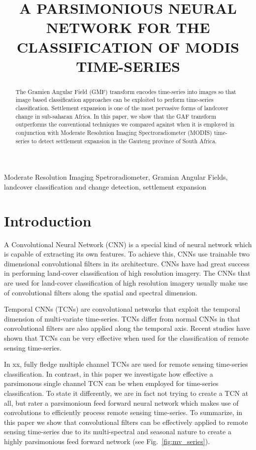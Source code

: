 \documentclass{article}
\title{A PARSIMONIOUS NEURAL NETWORK FOR THE CLASSIFICATION OF MODIS TIME-SERIES}
\begin{document}
%
\maketitle
%
\begin{abstract}
The Gramien Angular Field (GMF) transform encodes time-series into images so that image based classification approaches can be exploited to perform time-series classification. Settlement expansion is one of the most pervasive forms of landcover change in sub-saharan Africa. In this paper, we show that the GAF transform outperforms the conventional techniques we compared against when it is employed in conjunction with Moderate Resolution Imaging Spectroradiometer (MODIS) time-series to detect settlement expansion in the Gauteng province of South Africa.   
\end{abstract}
%
\begin{keywords}
Moderate Resolution Imaging Spetroradiometer, Gramian Angular Fields, landcover classification and change detection, settlement expansion
\end{keywords}
%
\section{Introduction}
\label{sec:intro}
A Convolutional Neural Network (CNN) is a special kind of neural network which is capable of extracting its own features. To achieve this, CNNs use trainable two dimensional convolutional filters in its architecture. CNNs have had great success in performing land-cover classification of high resolution imagery. The CNNs that are used for land-cover classification of high resolution imagery usually make use of convolutional filters along the spatial and spectral dimension.

Temporal CNNs (TCNs) are convolutional networks that
exploit the temporal dimension of multi-variate time-series. TCNs differ from normal CNNs in that convolutional filters are also applied along the temporal axis. Recent studies have shown that TCNs can be very effective when used for the classification of remote sensing time-series. 

In xx, fully fledge multiple channel TCNs are used for remote sensing time-series classification. In contrast, in this paper we investigate how effective a parsimonous single channel TCN can be when employed for time-series classification. To state it differently, we are in fact not trying to create a TCN at all, but rater a parsimonioun feed forward neural network which makes use of convolutions to efficiently process remote sensing time-series. To summarize, in this paper we show that convolutional filters can be effectively applied to remote sensing time-series due to its multi-spectral and seasonal nature to create a highly parsimonious feed forward network (see Fig.~\ref{fig:mv_series}).   
\end{document}
